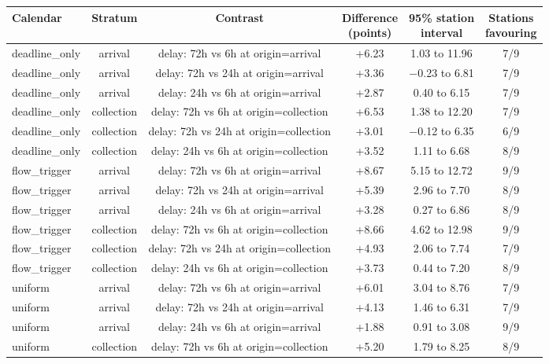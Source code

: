 \documentclass[lineno,pdflatex,sn-apa]{sn-jnl}%
\theoremstyle{thmstyleone}%
\theoremstyle{thmstyletwo}%
\theoremstyle{thmstylethree}%
\begin{document}
\begin{center}
\footnotesize
\setlength{\tabcolsep}{2pt}
\begin{tabular}{@{}lccccc@{}}
\toprule
Calendar & Stratum & Contrast & \shortstack{Difference\\(points)} & \shortstack{95\% station\\interval} & \shortstack{Stations\\favouring}\\
\midrule
deadline\_only & arrival & delay: 72h vs 6h at origin=arrival & +6.23 & 1.03 to 11.96 & 7/9\\
deadline\_only & arrival & delay: 72h vs 24h at origin=arrival & +3.36 & $-$0.23 to 6.81 & 7/9\\
deadline\_only & arrival & delay: 24h vs 6h at origin=arrival & +2.87 & 0.40 to 6.15 & 7/9\\
deadline\_only & collection & delay: 72h vs 6h at origin=collection & +6.53 & 1.38 to 12.20 & 7/9\\
deadline\_only & collection & delay: 72h vs 24h at origin=collection & +3.01 & $-$0.12 to 6.35 & 6/9\\
deadline\_only & collection & delay: 24h vs 6h at origin=collection & +3.52 & 1.11 to 6.68 & 8/9\\
flow\_trigger & arrival & delay: 72h vs 6h at origin=arrival & +8.67 & 5.15 to 12.72 & 9/9\\
flow\_trigger & arrival & delay: 72h vs 24h at origin=arrival & +5.39 & 2.96 to 7.70 & 8/9\\
flow\_trigger & arrival & delay: 24h vs 6h at origin=arrival & +3.28 & 0.27 to 6.86 & 8/9\\
flow\_trigger & collection & delay: 72h vs 6h at origin=collection & +8.66 & 4.62 to 12.98 & 9/9\\
flow\_trigger & collection & delay: 72h vs 24h at origin=collection & +4.93 & 2.06 to 7.74 & 7/9\\
flow\_trigger & collection & delay: 24h vs 6h at origin=collection & +3.73 & 0.44 to 7.20 & 8/9\\
uniform & arrival & delay: 72h vs 6h at origin=arrival & +6.01 & 3.04 to 8.76 & 7/9\\
uniform & arrival & delay: 72h vs 24h at origin=arrival & +4.13 & 1.46 to 6.31 & 7/9\\
uniform & arrival & delay: 24h vs 6h at origin=arrival & +1.88 & 0.91 to 3.08 & 9/9\\
uniform & collection & delay: 72h vs 6h at origin=collection & +5.20 & 1.79 to 8.25 & 8/9\\

\end{tabular}
\end{center}
\end{document}
